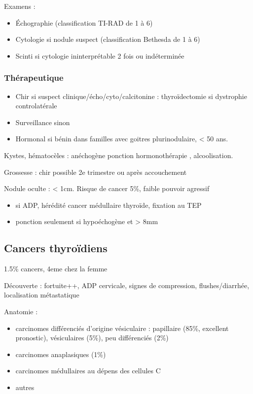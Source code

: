 \documentclass[11pt]{article}
\begin{document}
Examens : 
\begin{itemize}
\item Échographie (classification TI-RAD de 1 à 6)
\item Cytologie si nodule suspect (classification Bethesda de 1 à 6)
\item Scinti si cytologie ininterprétable 2 fois ou indéterminée
\end{itemize}

\subsubsection{Thérapeutique}
\label{sec:orgac2965e}
\begin{itemize}
\item Chir si suspect clinique/écho/cyto/calcitonine \inc\inc{} : thyroïdectomie si dystrophie controlatérale
\item Surveillance sinon
\item Hormonal si bénin dans familles avec goitres plurinodulaire, < 50 ans.
\end{itemize}

Kystes, hématocèles : anéchogène \thus ponction \textpm{} hormonothérapie , alcoolisation.

Grossesse : chir possible 2e trimestre ou après accouchement 

Nodule oculte : < 1cm. Risque de cancer 5\%, faible pouvoir agressif
\begin{itemize}
\item \danger si ADP, hérédité cancer médullaire thyroïde, fixation au TEP
\item ponction seulement si hypoéchogène et > 8mm
\end{itemize}
\subsection{Cancers thyroïdiens}
\label{sec:org523f33e}
1.5\% cancers, 4eme chez la femme

Découverte : fortuite++, ADP cervicale, signes de compression, flushes/diarrhée,
localisation métastatique

Anatomie :
\begin{itemize}
\item carcinomes différenciés d'origine vésiculaire : papillaire (85\%, excellent
pronostic), vésiculaires (5\%), peu différenciés (2\%)
\item carcinomes anaplasiques (1\%)
\item carcinomes médullaires au dépens des cellules C
\item autres
\end{itemize}
\end{document}
